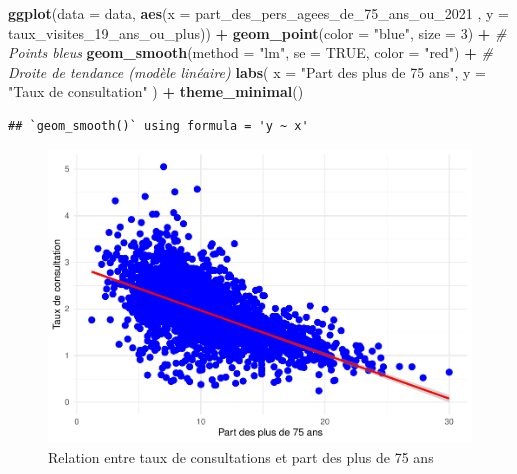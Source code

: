 \documentclass[
]{article}
\newenvironment{Shaded}{\begin{snugshade}}{\end{snugshade}}
\newcommand{\AttributeTok}[1]{\textcolor[rgb]{0.13,0.29,0.53}{#1}}
\newcommand{\CommentTok}[1]{\textcolor[rgb]{0.56,0.35,0.01}{\textit{#1}}}
\newcommand{\ConstantTok}[1]{\textcolor[rgb]{0.56,0.35,0.01}{#1}}
\newcommand{\DecValTok}[1]{\textcolor[rgb]{0.00,0.00,0.81}{#1}}
\newcommand{\FunctionTok}[1]{\textcolor[rgb]{0.13,0.29,0.53}{\textbf{#1}}}
\newcommand{\NormalTok}[1]{#1}
\newcommand{\SpecialCharTok}[1]{\textcolor[rgb]{0.81,0.36,0.00}{\textbf{#1}}}
\newcommand{\StringTok}[1]{\textcolor[rgb]{0.31,0.60,0.02}{#1}}
\begin{document}
\begin{Shaded}
\begin{Highlighting}[]
\FunctionTok{ggplot}\NormalTok{(}\AttributeTok{data =}\NormalTok{ data, }\FunctionTok{aes}\NormalTok{(}\AttributeTok{x =}\NormalTok{ part\_des\_pers\_agees\_de\_75\_ans\_ou\_2021 , }\AttributeTok{y =}\NormalTok{ taux\_visites\_19\_ans\_ou\_plus)) }\SpecialCharTok{+}
  \FunctionTok{geom\_point}\NormalTok{(}\AttributeTok{color =} \StringTok{"blue"}\NormalTok{, }\AttributeTok{size =} \DecValTok{3}\NormalTok{) }\SpecialCharTok{+}          \CommentTok{\# Points bleus}
  \FunctionTok{geom\_smooth}\NormalTok{(}\AttributeTok{method =} \StringTok{"lm"}\NormalTok{, }\AttributeTok{se =} \ConstantTok{TRUE}\NormalTok{, }\AttributeTok{color =} \StringTok{"red"}\NormalTok{) }\SpecialCharTok{+}  \CommentTok{\# Droite de tendance (modèle linéaire)}
  \FunctionTok{labs}\NormalTok{(}
    \AttributeTok{x =} \StringTok{"Part des plus de 75 ans"}\NormalTok{,}
    \AttributeTok{y =} \StringTok{"Taux de consultation"}
\NormalTok{  ) }\SpecialCharTok{+}
  \FunctionTok{theme\_minimal}\NormalTok{()}
\end{Highlighting}
\end{Shaded}

\begin{verbatim}
## `geom_smooth()` using formula = 'y ~ x'
\end{verbatim}

\begin{figure}

{\centering \includegraphics{4_Analyse_Descriptive_files/figure-latex/unnamed-chunk-9-1} 

}

\caption{Relation entre taux de consultations et part des plus de 75 ans}\label{fig:unnamed-chunk-9}
\end{figure}
\end{document}

